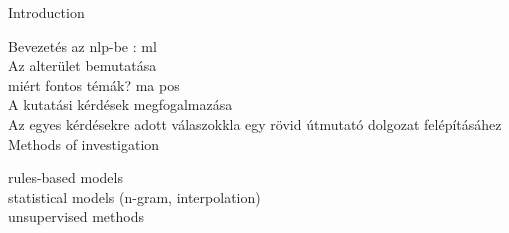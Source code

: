 
Introduction

Bevezetés az \gls{nlp}-be : \gls{ml} \\
Az alterület bemutatása \\
miért fontos témák? \gls{ma} \gls{pos}  \\
A kutatási kérdések megfogalmazása  \\
Az egyes kérdésekre adott válaszokkla egy rövid útmutató  dolgozat felépításáhez  \\

Methods of investigation

rules-based models  \\
statistical models (n-gram, interpolation)  \\
unsupervised methods  \\


